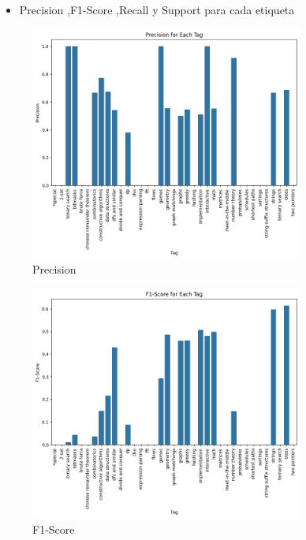 \documentclass{article}
\begin{document}
\begin{itemize}
    	\item Precision ,F1-Score ,Recall y Support para cada etiqueta
\end{itemize}
\begin{figure}[H]
    \centering
    \includegraphics[width=0.8\textwidth]{imgs/precisonnb.png}
    \caption{Precision}
    \label{fig:p}
\end{figure}
\newpage
\begin{figure}[H]
    \centering
    \includegraphics[width=0.8\textwidth]{imgs/f1nb.png}
    \caption{F1-Score}
    \label{fig:f1}
\end{figure}
\end{document}
